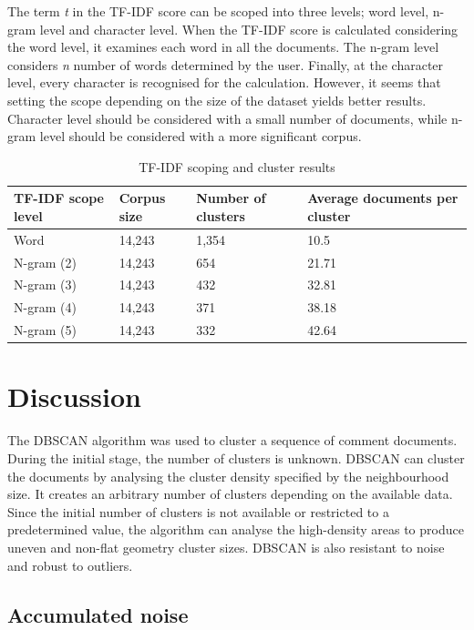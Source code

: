\documentclass[conference]{IEEEtran}
\begin{document}
The term \textit{t} in the TF-IDF score can be scoped into three levels; word level, n-gram level and character level. When the TF-IDF score is calculated considering the word level, it examines each word in all the documents. The n-gram level considers \textit{n} number of words determined by the user. Finally, at the character level, every character is recognised for the calculation. However, it seems that setting the scope depending on the size of the dataset yields better results. Character level should be considered with a small number of documents, while n-gram level should be considered with a more significant corpus. 

\begin{table}[!h]
\renewcommand{\arraystretch}{1.3}

\caption{TF-IDF scoping and cluster results}
\label{table_example}
\centering
\begin{tabular}{|P{1cm}|P{2cm}|P{2cm}|P{2cm}|}
\hline
 \bfseries TF-IDF scope level & \bfseries Corpus size & \bfseries Number of clusters & \bfseries Average documents per cluster\\
 \hline
 Word & 14,243 & 1,354 & 10.5\\
 \hline
 N-gram (2) & 14,243 & 654 & 21.71\\
 \hline 
 N-gram (3) & 14,243 & 432 & 32.81\\
 \hline
 N-gram (4) & 14,243 & 371 & 38.18\\
 \hline
 N-gram (5) & 14,243 & 332 & 42.64\\
 \hline
\end{tabular}
\end{table}

\section{Discussion}

The DBSCAN algorithm was used to cluster a sequence of comment documents. During the initial stage, the number of clusters is unknown. DBSCAN can cluster the documents by analysing the cluster density specified by the neighbourhood size. It creates an arbitrary number of clusters depending on the available data. Since the initial number of clusters is not available or restricted to a predetermined value, the algorithm can analyse the high-density areas to produce uneven and non-flat geometry cluster sizes. DBSCAN is also resistant to noise and robust to outliers. \cite{scikit-learn}

\subsection{Accumulated noise}
\end{document}
